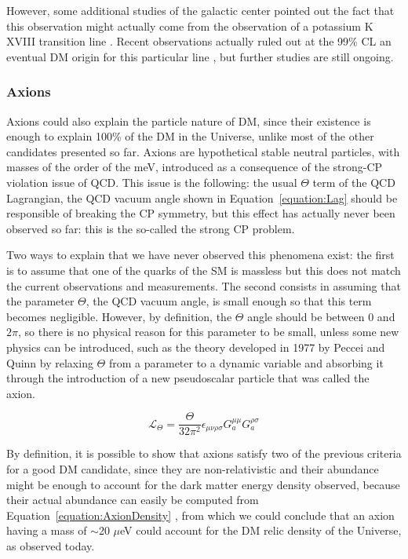 \documentclass[a4paper, 10pt, openright]{report}
\begin{document}
However, some additional studies of the galactic center pointed out the fact that this observation might actually come from the observation of a potassium K XVIII transition line \cite{NoDetection}. Recent observations actually ruled out at the 99\% \ac{CL} an eventual \ac{DM} origin for this particular line \cite{Nope}, but further studies are still ongoing.

\subsubsection*{Axions}
Axions could also explain the particle nature of \ac{DM}, since their existence is enough to explain 100\% of the \ac{DM} in the Universe, unlike most of the other candidates presented so far. Axions are hypothetical stable neutral particles, with masses of the order of the meV, introduced as a consequence of the strong-CP violation issue of \ac{QCD}. This issue is the following: the usual $\Theta$ term of the \ac{QCD} Lagrangian, the \ac{QCD} vacuum angle shown in Equation~\ref{equation:Lag} \cite{QCDLag} should be responsible of breaking the CP symmetry, but this effect has actually never been observed so far: this is the so-called the strong CP problem. 

Two ways to explain that we have never observed this phenomena exist: the first is to assume that one of the quarks of the \ac{SM} is massless but this does not match the current observations and measurements. The second consists in assuming that the parameter $\Theta$, the \ac{QCD} vacuum angle, is small enough so that this term becomes negligible. However, by definition, the $\Theta$ angle should be between 0 and $2\pi$, so there is no physical reason for this parameter to be small, unless some new physics can be introduced, such as the theory developed in 1977 by Peccei and Quinn \cite{Peccei} by relaxing $\Theta$ from a parameter to  a dynamic variable and absorbing it through the introduction of a new pseudoscalar particle that was called the axion.

\begin{equation}
\label{equation:Lag}
\mathcal{L}_\Theta = \frac{\Theta}{32 \pi^2} \epsilon_{\mu \nu \rho \sigma} G_a^{\mu \mu} G_a^{\rho \sigma}
\end{equation}

By definition, it is possible to show that axions satisfy two of the previous criteria for a good \ac{DM} candidate, since they are non-relativistic and their abundance might be enough to account for the dark matter energy density observed, because their actual abundance can easily be computed from Equation~\ref{equation:AxionDensity} \cite{AxionSearches}, from which we could conclude that an axion having a mass of $\sim$20 $\mu$eV could account for the \ac{DM} relic density of the Universe, as observed today. 
\end{document}
